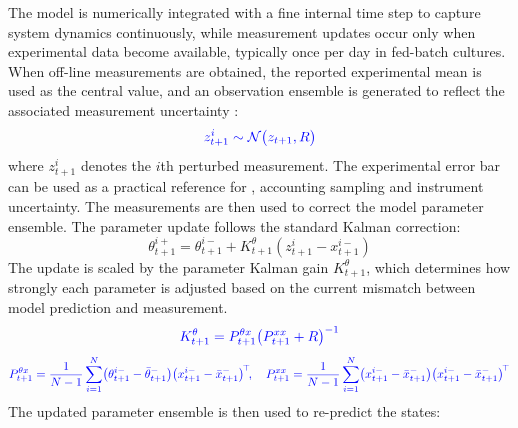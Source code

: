 The model is numerically integrated with a fine internal time step to capture system dynamics continuously, while measurement updates occur only when experimental data become available, typically once per day in fed-batch cultures. When off-line measurements are obtained, the reported experimental mean is used as the central value, and an observation ensemble is generated to reflect the associated measurement uncertainty \cite{Evensen2022DataProblem}:
\setlength{\abovedisplayskip}{3pt}
\setlength{\belowdisplayskip}{3pt}
\begin{equation}
{\color{blue}z_{t+1}^i \sim \mathcal{N}\bigl(z_{t+1}, R\bigr)}
\label{obs_rep}
\end{equation}
where $z_{t+1}^i$ denotes the $i$th perturbed measurement. The experimental error bar can be used as a practical reference for , accounting  sampling and instrument uncertainty.  The measurements are then used to correct the model parameter ensemble. The parameter update follows the standard Kalman correction: 
\begin{equation}
\theta_{t+1}^{i+}=\theta_{t+1}^{i-}+K_{t+1}^\theta\left(z_{t+1}^i-x_{t+1}^{i-}\right)
\label{para_update}
\end{equation}
The update is scaled by the parameter Kalman gain $K_{t+1}^\theta$, which determines how strongly each parameter is adjusted based on the current mismatch between model prediction and measurement.
\setlength{\abovedisplayskip}{3pt}
\setlength{\belowdisplayskip}{3pt}
\begin{equation}
{\color{blue}K_{t+1}^\theta = P_{t+1}^{\theta x}\bigl(P_{t+1}^{xx} + R\bigr)^{-1}}
\label{para_Kgain}
\end{equation}
\begin{equation}
{\color{blue}P_{t+1}^{\theta x} = \frac{1}{N-1}\sum_{i=1}^{N}\bigl(\theta_{t+1}^{i-} - \bar{\theta}_{t+1}^{-}\bigr)\bigl(x_{t+1}^{i-} - \bar{x}_{t+1}^{-}\bigr)^{\!\top}\!, \quad
P_{t+1}^{xx} = \frac{1}{N-1}\sum_{i=1}^{N}\bigl(x_{t+1}^{i-} - \bar{x}_{t+1}^{-}\bigr)\bigl(x_{t+1}^{i-} - \bar{x}_{t+1}^{-}\bigr)^{\!\top}}
\label{eq:sample_cov}
\end{equation}
 The updated parameter ensemble is then used to re-predict the states:
